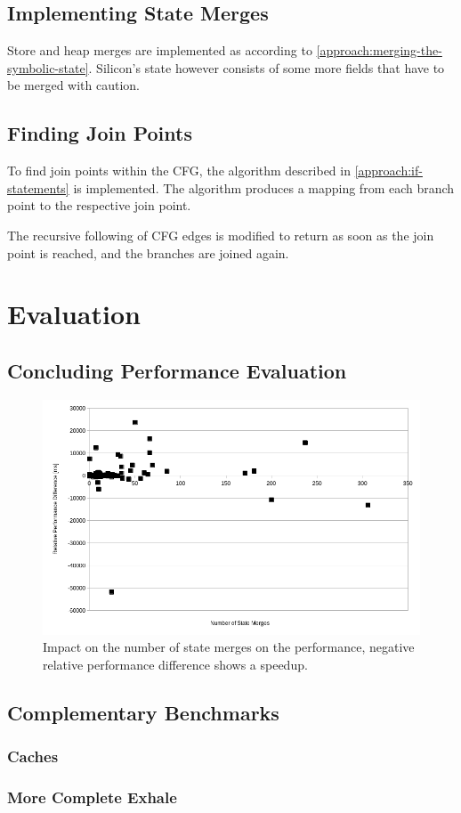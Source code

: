 \documentclass[11pt]{article}
\begin{document}
    \subsection{Implementing State Merges}

    Store and heap merges are implemented as according to \ref{approach:merging-the-symbolic-state}.
    Silicon's state however consists of some more fields that have to be merged with caution.

    \subsection{Finding Join Points}

    To find join points within the CFG, the algorithm described in \ref{approach:if-statements} is implemented.
    The algorithm produces a mapping from each branch point to the respective join point.

    The recursive following of CFG edges is modified to return as soon as the join point is reached, and the
    branches are joined again.

    \section{Evaluation}

    \subsection{Concluding Performance Evaluation}

    \begin{figure}[H]
        \includegraphics[width=\linewidth]{state-merges-vs-performance.png}
        \caption{
            Impact on the number of state merges on the performance,
            negative relative performance difference shows a speedup.
        }
        \label{fig:state-merges}
    \end{figure}

    \subsection{Complementary Benchmarks}

    \subsubsection{Caches}

    \subsubsection{More Complete Exhale}

    \newpage
    \printbibliography
    
\end{document}

